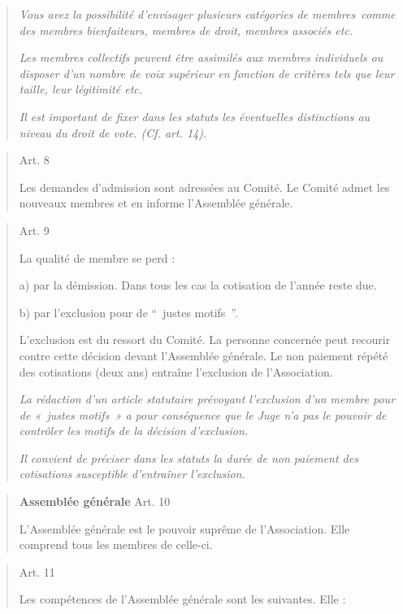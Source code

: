 \documentclass[10pt]{article}
\begin{document}
\begin{quote}
\emph{Vous avez la possibilité d'envisager plusieurs catégories de
membres~comme des membres bienfaiteurs, membres de droit, membres
associés etc.}

\emph{Les membres collectifs peuvent être assimilés aux membres
individuels ou disposer d'un nombre de voix supérieur en fonction de
critères tels que leur taille, leur légitimité etc.}

\emph{Il est important de fixer dans les statuts les éventuelles
distinctions au niveau du droit de vote. (Cf. art. 14).}

\end{quote}
\begin{quote}
Art. 8

Les demandes d'admission sont adressées au Comité. Le Comité admet les
nouveaux membres et en informe l'Assemblée générale.

\end{quote}
\begin{quote}
Art. 9

La qualité de membre se perd :

a) par la démission. Dans tous les cas la cotisation de l'année reste
due.

b) par l'exclusion pour de ``~justes motifs~''.

L'exclusion est du ressort du Comité. La personne concernée peut
recourir contre cette décision devant l'Assemblée générale. Le non
paiement répété des cotisations (deux ans) entraîne l'exclusion de
l'Association.

\emph{La rédaction d'un article statutaire prévoyant l'exclusion d'un
membre pour de «~justes motifs~» a pour conséquence que le Juge n'a pas
le pouvoir de contrôler les motifs de la décision d'exclusion.}

\emph{Il convient de préciser dans les statuts la durée de non paiement
des cotisations susceptible d'entraîner l'exclusion.}

\end{quote}
\begin{quote}
\textbf{Assemblée générale}
Art. 10

L'Assemblée générale est le pouvoir suprême de l'Association. Elle
comprend tous les membres de celle-ci.

\end{quote}
\begin{quote}
Art. 11

Les compétences de l'Assemblée générale sont les suivantes. Elle :
\end{quote}
\end{document}
